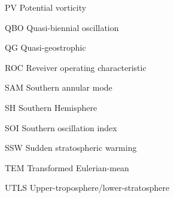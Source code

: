 \begin{description*}
\item[PV] Potential vorticity
\item[QBO] Quasi-biennial oscillation
\item[QG] Quasi-geostrophic
\item[ROC] Reveiver operating characteristic
\item[SAM] Southern annular mode
\item[SH] Southern Hemisphere
\item[SOI] Southern oscillation index
\item[SSW] Sudden stratospheric warming
\item[TEM] Transformed Eulerian-mean
\item[UTLS] Upper-troposphere/lower-stratosphere

\end{description*}



